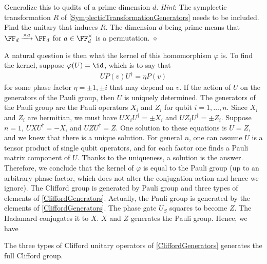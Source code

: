 \begin{exc}
Generalize this to qudits of a prime dimension $d$.
{\em Hint}:
The symplectic transformation $R$ of \ref{SymplecticTransformationGenerators}
needs to be included.
Find the unitary that induces $R$.
The dimension $d$ being prime means that $\FF_d \xrightarrow{ \times a} \FF_d$
for $a \in \FF_d^\times$ is a permutation.
\hfill $\diamond$ \end{exc}

A natural question is then what the kernel of this homomorphism $\varphi$ is.
To find the kernel, suppose $\varphi(U) = \id$, which is to say that
\begin{align}
U P(v) U^\dagger = \eta P(v)
\end{align}
for some phase factor $\eta = \pm 1, \pm i$ that may depend on $v$.
If the action of $U$ on the generators of the Pauli group,
then $U$ is uniquely determined.
The generators of the Pauli group are the Pauli operators $X_i$ and $Z_i$ for qubit $i=1,\ldots,n$.
Since $X_i$ and $Z_i$ are hermitian, we must have $U X_i U^\dagger = \pm X_i$ and
$U Z_i U^\dagger = \pm Z_i$.
Suppose $n=1$, $U X U^\dagger = - X$, and $U Z U^\dagger = Z$.
One solution to these equations is $U = Z$, and we knew that there is a unique solution.
For general $n$, one can assume $U$ is a tensor product of single qubit operators,
and for each factor one finds a Pauli matrix component of $U$.
Thanks to the uniqueness, a solution is the answer.
Therefore, we conclude that the kernel of $\varphi$ is equal to the Pauli group 
(up to an arbitrary phase factor,
which does not alter the conjugation action and hence we ignore).
The Clifford group is generated by Pauli group and three types of elements of \eqref{CliffordGenerators}.
Actually, the Pauli group is generated by the elements of \eqref{CliffordGenerators}.
The phase gate $U_S$ squares to become $Z$.
The Hadamard conjugates it to $X$.
$X$ and $Z$ generates the Pauli group. Hence, we have
\begin{prop}
The three types of Clifford unitary operators of \eqref{CliffordGenerators} generates the full Clifford group.
\end{prop}


